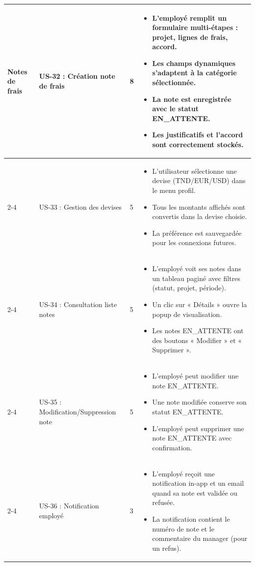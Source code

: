 \documentclass[12pt,a4paper]{report}
\begin{document}
\begin{longtable}{|p{2.5cm}|p{3cm}|p{1.5cm}|p{8cm}|}
\multirow{11}{*}{Notes de frais} & US-32 : Création note de frais & 8 & \begin{itemize}
 \item L’employé remplit un formulaire multi-étapes : projet, lignes de frais, accord.
 \item Les champs dynamiques s’adaptent à la catégorie sélectionnée.
 \item La note est enregistrée avec le statut EN\_ATTENTE.
 \item Les justificatifs et l’accord sont correctement stockés.
\end{itemize} \\
\cline{2-4}
& US-33 : Gestion des devises & 5 & \begin{itemize}
 \item L’utilisateur sélectionne une devise (TND/EUR/USD) dans le menu profil.
 \item Tous les montants affichés sont convertis dans la devise choisie.
 \item La préférence est sauvegardée pour les connexions futures.
\end{itemize} \\
\cline{2-4}
& US-34 : Consultation liste notes & 5 & \begin{itemize}
 \item L’employé voit ses notes dans un tableau paginé avec filtres (statut, projet, période).
 \item Un clic sur « Détails » ouvre la popup de visualisation.
 \item Les notes EN\_ATTENTE ont des boutons « Modifier » et « Supprimer ».
\end{itemize} \\
\cline{2-4}
& US-35 : Modification/Suppression note & 5 & \begin{itemize}
 \item L’employé peut modifier une note EN\_ATTENTE.
 \item Une note modifiée conserve son statut EN\_ATTENTE.
 \item L’employé peut supprimer une note EN\_ATTENTE avec confirmation.
\end{itemize} \\
\cline{2-4}
& US-36 : Notification employé & 3 & \begin{itemize}
 \item L’employé reçoit une notification in-app et un email quand sa note est validée ou refusée.
 \item La notification contient le numéro de note et le commentaire du manager (pour un refus).

\end{itemize}
\end{longtable}
\end{document}
